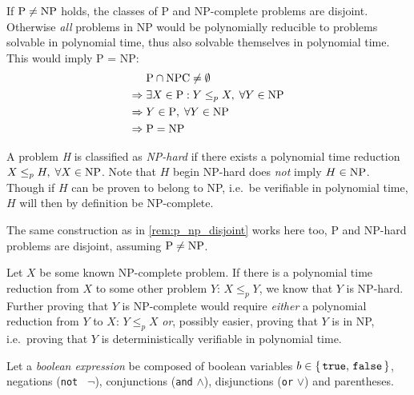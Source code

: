 \begin{remark}\label{rem:p_np_disjoint}
	If \(\text{P} \neq \text{NP}\) holds, the classes of P and NP-complete problems are disjoint. Otherwise \emph{all} problems in NP would be polynomially reducible to problems solvable in polynomial time, thus also solvable themselves in polynomial time. This would imply P = NP:
	\begin{align*}
		& \text{P} \cap \text{NPC} \neq \emptyset \\
		\Rightarrow \; & \exists X \in \text{P} : Y \leq_p X, \; \forall Y \in \text{NP} \\
		\Rightarrow \; & Y \in \text{P}, \; \forall Y \in \text{NP} \\
		\Rightarrow \; & \text{P} = \text{NP}
	\end{align*}
\end{remark}

\begin{definition}\label{def:np_hard}
	A problem \emph{H} is classified as \emph{NP-hard} if there exists a polynomial time reduction \(X \leq_p H, \; \forall X \in \text{NP}\). 
	Note that \(H\) begin NP-hard does \emph{not} imply \(H \in \text{NP}\). 
	Though if \(H\) can be proven to belong to NP, i.e.~be verifiable in polynomial time, \(H\) will then by definition be NP-complete.
\end{definition}

\begin{remark}\label{rem:p_np_hard_disjoint}
	The same construction as in \cref{rem:p_np_disjoint} works here too, P and NP-hard problems are disjoint, assuming \(\text{P} \neq \text{NP}\).
\end{remark}

\begin{remark}\label{note:npc_proving}
	Let \(X\) be some known NP-complete problem. 
	If there is a polynomial time reduction from \(X\) to some other problem \(Y\): \(X \leq_p Y\), we know that \(Y\) is NP-hard. 
	Further proving that \(Y\) is NP-complete would require \emph{either} a polynomial reduction from \(Y\) to \(X\): \(Y \leq_p X\) \emph{or}, possibly easier, proving that \(Y\) is in NP, i.e.~proving that \(Y\) is deterministically verifiable in polynomial time.
\end{remark}

Let a \emph{boolean expression} be composed of boolean variables \(b \in \set{\texttt{true},\, \texttt{false}}\), negations (\texttt{not } \(\neg\)), conjunctions (\texttt{and} \(\land\)), disjunctions (\texttt{or} \(\lor\)) and parentheses.

